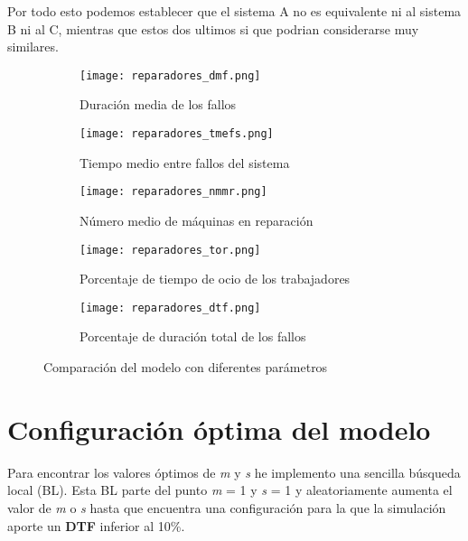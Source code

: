 Por todo esto podemos establecer que el sistema A no es equivalente ni al sistema B ni al C, mientras que estos dos ultimos si que podrian considerarse muy similares.

\begin{figure}[H]
	\centering
	\begin{subfigure}[b]{0.45\textwidth}
		\centering
		\texttt{[image: reparadores\_dmf.png]}
		\caption{Duración media de los fallos}
	\end{subfigure}
	\hfill
	\begin{subfigure}[b]{0.45\textwidth}
		\centering
		\texttt{[image: reparadores\_tmefs.png]}
		\caption{Tiempo medio entre fallos del sistema}
	\end{subfigure}
	\hfill
	\begin{subfigure}[b]{0.45\textwidth}
		\centering
		\texttt{[image: reparadores\_nmmr.png]}
		\caption{Número medio de máquinas en reparación}
	\end{subfigure}
	\hfill
	\begin{subfigure}[b]{0.45\textwidth}
		\centering
		\texttt{[image: reparadores\_tor.png]}
		\caption{Porcentaje de tiempo de ocio de los trabajadores}
	\end{subfigure}
	\hfill
	\begin{subfigure}[b]{\textwidth}
		\centering
		\texttt{[image: reparadores\_dtf.png]}
		\caption{Porcentaje de duración total de los fallos}
	\end{subfigure}
	\hfill
	\caption{Comparación del modelo con diferentes parámetros}
\end{figure}

\section{Configuración óptima del modelo}
Para encontrar los valores óptimos de \textit{m} y \textit{s} he implemento una sencilla búsqueda local (BL). Esta BL parte del punto \textit{m} = 1 y \textit{s} = 1 y aleatoriamente aumenta el valor de \textit{m} o \textit{s} hasta que encuentra una configuración para la que la simulación aporte un \textbf{DTF} inferior al 10\%.

